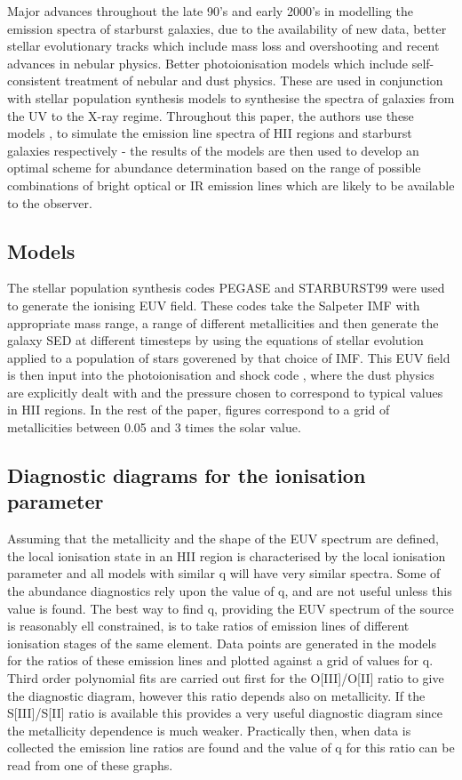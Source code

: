 \documentclass{literature}
\begin{document}
Major advances throughout the late 90's and early 2000's in modelling the emission spectra of starburst galaxies, due to the availability of new data, better stellar evolutionary tracks which include mass loss and overshooting and recent advances in nebular physics. Better photoionisation models which include self-consistent treatment of nebular and dust physics. These are used in conjunction with stellar population synthesis models to synthesise the spectra of galaxies from the UV to the X-ray regime. Throughout this paper, the authors use these models \citep{Dopita2000}, \citep{Kewley2001} to simulate the emission line spectra of HII regions and starburst galaxies respectively - the results of the models are then used to develop an optimal scheme for abundance determination based on the range of possible combinations of bright optical or IR emission lines which are likely to be available to the observer. \\

\subsection{Models}
The stellar population synthesis codes PEGASE \citep{Fioc1997} and STARBURST99 \citep{Leitherer1999} were used to generate the ionising EUV field. These codes take the Salpeter IMF with appropriate mass range, a range of different metallicities and then generate the galaxy SED at different timesteps by using the equations of stellar evolution applied to a population of stars goverened by that choice of IMF. This EUV field is then input into the photoionisation and shock code \citep{Sutherland1993}, where the dust physics are explicitly dealt with and the pressure chosen to correspond to typical values in HII regions. In the rest of the paper, figures correspond to a grid of metallicities between 0.05 and 3 times the solar value.

\subsection{Diagnostic diagrams for the ionisation parameter}
Assuming that the metallicity and the shape of the EUV spectrum are defined, the local ionisation state in an HII region is characterised by the local ionisation parameter and all models with similar q will have very similar spectra. Some of the abundance diagnostics rely upon the value of q, and are not useful unless this value is found. The best way to find q, providing the EUV spectrum of the source is reasonably ell constrained, is to take ratios of emission lines of different ionisation stages of the same element. Data points are generated in the models for the ratios of these emission lines and plotted against a grid of values for q. Third order polynomial fits are carried out first for the O[III]/O[II] ratio to give the diagnostic diagram, however this ratio depends also on metallicity. If the S[III]/S[II] ratio is available this provides a very useful diagnostic diagram since the metallicity dependence is much weaker. Practically then, when data is collected the emission line ratios are found and the value of q for this ratio can be read from one of these graphs.
\end{document}
